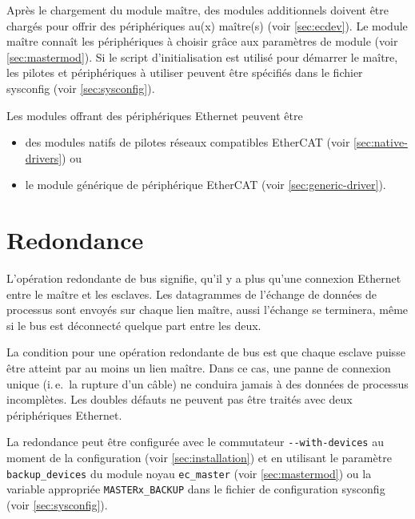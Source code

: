 \documentclass[a4paper,12pt,BCOR=6mm,bibtotoc,idxtotoc]{scrbook}
\begin{document}
Apr\`es le chargement du module ma\^itre, des modules additionnels
doivent \^etre charg\'es pour offrir des p\'eriph\'eriques au(x)
ma\^itre(s) (voir \autoref{sec:ecdev}). Le module ma\^itre conna\^it
les p\'eriph\'eriques \`a choisir gr\^ace aux param\`etres de module
(voir \autoref{sec:mastermod}). Si le script d'initialisation est
utilis\'e pour d\'emarrer le ma\^itre, les pilotes et
p\'eriph\'eriques \`a utiliser peuvent \^etre sp\'ecifi\'es dans le
fichier sysconfig (voir \autoref{sec:sysconfig}).

Les modules offrant des p\'eriph\'eriques Ethernet peuvent \^etre

\begin{itemize}
\item des modules natifs de pilotes r\'eseaux compatibles EtherCAT (voir
  \autoref{sec:native-drivers}) ou
\item le module g\'en\'erique de p\'eriph\'erique EtherCAT (voir
  \autoref{sec:generic-driver}).
\end{itemize}


\section{Redondance}
\label{sec:redundancy}

L'op\'eration redondante de bus signifie, qu'il y a plus qu'une
connexion Ethernet entre le ma\^itre et les esclaves.  Les
datagrammes de l'\'echange de donn\'ees de processus sont envoy\'es
sur chaque lien ma\^itre, aussi l'\'echange se terminera, m\^eme si le
bus est d\'econnect\'e quelque part entre les deux.

La condition pour une op\'eration redondante de bus est que chaque
esclave puisse \^etre atteint par au moins un lien ma\^itre. Dans ce
cas, une panne de connexion unique (i.\,e.~la rupture d'un c\^able) ne
conduira jamais \`a des donn\'ees de processus incompl\`etes.  Les
doubles d\'efauts ne peuvent pas \^etre trait\'es avec deux
p\'eriph\'eriques Ethernet.

La redondance peut \^etre configur\'ee avec le commutateur
\lstinline+--with-devices+ au moment de la configuration (voir
\autoref{sec:installation}) et en utilisant le param\`etre
\lstinline+backup_devices+ du module noyau \lstinline+ec_master+ (voir
\autoref{sec:mastermod}) ou la variable appropri\'ee
\lstinline+MASTERx_BACKUP+ dans le fichier de configuration sysconfig
(voir \autoref{sec:sysconfig}).
\end{document}
